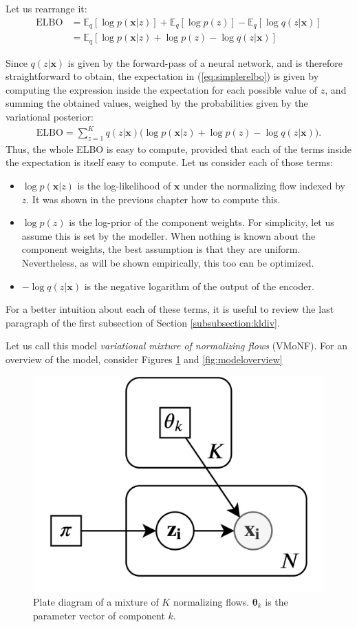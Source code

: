 Let us rearrange it:
\begin{align}
    \text{ELBO} &= \mathbb{E}_q [\log p(\bm{x}|z)] + \mathbb{E}_q [\log p(z)] - \mathbb{E}_q [\log q(z|\bm{x})]
        \label{eq:threepartelbo} \\
    &= \mathbb{E}_q [\log p(\bm{x}|z) + \log p(z) - \log q(z|\bm{x})] \label{eq:simplerelbo}
\end{align}

Since $q(z|\bm{x})$ is given by the forward-pass of a neural network, and is therefore
straightforward to obtain, the expectation in (\ref{eq:simplerelbo}) is given by
computing the expression inside the expectation for each possible value of $z$,
and summing the obtained values, weighed by the probabilities given by the variational posterior:
\begin{align}
    \text{ELBO} = \sum_{z=1}^K q(z|\bm{x})\big(\log p(\bm{x}|z) + \log p(z) - \log q(z|\bm{x})\big).
\end{align}
Thus, the whole ELBO is easy to compute, provided that each of the terms inside
the expectation is itself easy to compute. Let us consider each of those terms:
\begin{itemize}
    \item $\log p(\bm{x}|z)$ is the log-likelihood of $\bm{x}$ under the normalizing
        flow indexed by $z$. It was shown in the previous chapter how to compute
        this.
    \item $\log p(z)$ is the log-prior of the component weights. For simplicity,
        let us assume this is set by the modeller. When nothing is known about
        the component weights, the best assumption is that they are uniform.
        Nevertheless, as will be shown empirically, this too can be optimized.
    \item $- \log q(z|\bm{x})$ is the negative logarithm of the output of the encoder.
\end{itemize}

For a better intuition about each of these terms, it is useful to review the last
paragraph of the first subsection of Section \ref{subsubsection:kldiv}.

Let us call this model \emph{variational mixture of normalizing flows} (VMoNF). For an overview of
the model, consider Figures \ref{fig:plate} and \ref{fig:modeloverview}

\begin{figure}[!htb]
  \centering
  \includegraphics[width=0.5\linewidth]{figures/plate_diagram.png}
  \caption{Plate diagram of a mixture of $K$ normalizing flows. $\bm\theta_k$ is the
    parameter vector of component $k$.}
  \label{fig:plate}
\end{figure}


